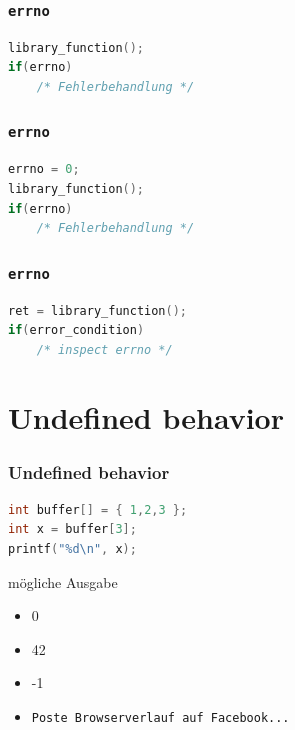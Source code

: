 \documentclass[12pt,compress]{beamer}
\begin{document}
\begin{frame}[fragile]
\frametitle{\texttt{errno}}

\begin{lstlisting}[language=C,basicstyle=\ttfamily\small,keywordstyle=\color{red}]
library_function();
if(errno)
    /* Fehlerbehandlung */
\end{lstlisting}
\end{frame}

\begin{frame}[fragile]
\frametitle{\texttt{errno}}

\begin{lstlisting}[language=C,basicstyle=\ttfamily\small,keywordstyle=\color{red}]
errno = 0;
library_function();
if(errno)
    /* Fehlerbehandlung */
\end{lstlisting}
\end{frame}

\begin{frame}[fragile]
\frametitle{\texttt{errno}}

\begin{lstlisting}[language=C,basicstyle=\ttfamily\small,keywordstyle=\color{red}]
ret = library_function();
if(error_condition)
    /* inspect errno */
\end{lstlisting}
\end{frame}

\section{Undefined behavior}


\begin{frame}[fragile]
\frametitle{Undefined behavior}

\begin{lstlisting}[language=C,basicstyle=\ttfamily\small,keywordstyle=\color{red}]
int buffer[] = { 1,2,3 };
int x = buffer[3];
printf("%d\n", x);
\end{lstlisting}

\vfill

mögliche Ausgabe
\begin{itemize}
\item 0
\item 42
\item -1
\item \texttt{Poste Browserverlauf auf Facebook...}
\end{itemize}
\end{frame}
\end{document}
